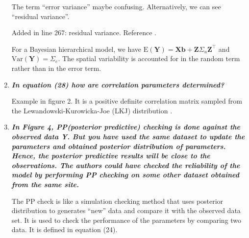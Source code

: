\documentclass[a4paper]{article}   	%
\newcommand{\E}{\mathrm{E}}
\newcommand{\Var}{\mathrm{Var}}
\newcommand{\qtitle}[1]{\textit{\textbf{#1}}}
\begin{document}
\begin{enumerate}
	The term ``error variance'' maybe confusing. Alternatively, we can see ``residual variance''. 
	
	Added in line 267: residual variance. Reference \textcite{Gabry2019Visualization}. 
	
	For a Bayesian hierarchical model, we have $\E(\bm{Y}) = \bm{X}\bm{b} + \bm{Z}\Sigma_u\bm{Z}^\top$ and $\Var(\bm{Y}) = \Sigma_e$. The spatial variability is accounted for in the random term rather than in the error term. 
    
    \item \qtitle{In equation (28) how are correlation parameters determined?}
    
    Example in figure 2. It is a positive definite correlation matrix sampled from the Lewandowski-Kurowicka-Joe (LKJ) distribution \parencite{Lewandowski2009Generating, McElreath2015Statistical}. 
    
    \item \qtitle{In Figure 4, PP(posterior predictive) checking is done against the observed data Y. But you have used the same dataset to update the parameters and obtained posterior distribution of parameters. Hence, the posterior predictive results will be close to the observations. The authors could have checked the reliability of the model by performing PP checking on some other dataset obtained from the same site.}
    
    The PP check is like a simulation checking method that uses posterior distribution to generates ``new'' data and compare it with the observed data set. It is used to check the performance of the parameters by comparing two data. It is defined in equation (24). 
    
    
\end{enumerate}

\renewcommand\bibname{References}%
\printbibliography
\end{document}
